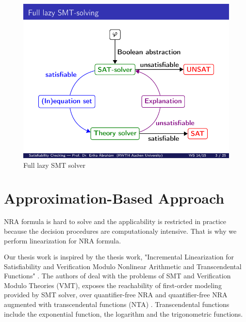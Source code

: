 \begin{figure}[ht!]
  \centering
  \includegraphics[width=1\linewidth]{./figures/FullLazySMT.pdf}
  \caption{Full lazy SMT solver \cite{brahm2010ALS}}
  \label{fig:FullLazySMT}
\end{figure}
\section{Approximation-Based Approach}
\label{sec:Approximation_Based_Approach}
NRA formula is hard to solve and the applicability is restricted in practice because the decision procedures are computationaly intensive.
That is why we perform linearization for NRA formula.\newline

\noindent Our thesis work is inspired by the thesis work, "Incremental Linearization for Satisfiability and Verification Modulo Nonlinear Arithmetic and Transcendental Functions" \cite{Cimatti:2018:ILS:3274693.3230639}.
The authors of \cite{Cimatti:2018:ILS:3274693.3230639} deal with the problems of SMT and Verification Modulo Theories (VMT), exposes the reachability of first-order modeling provided by SMT solver, over  quantifier-free NRA and quantifier-free NRA augmented with  transcendental functions (NTA) \cite{abdulla2013reachability}.
Transcendental functions include the exponential function, the logarithm and the trigonometric functions.\newline

